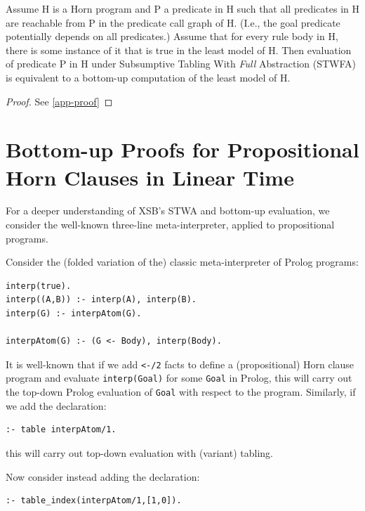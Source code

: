 \begin{theorem}
Assume H is a Horn program and P a predicate in H such that all
predicates in H are reachable from P in the predicate call graph of
H. (I.e., the goal predicate potentially depends on all predicates.)
Assume that for every rule body in H, there is some instance of it
that is true in the least model of H.  Then evaluation of predicate P
in H under Subsumptive Tabling With {\em Full} Abstraction (STWFA) is
equivalent to a bottom-up computation of the least model of H.
\end{theorem}

\begin{proof}
See \ref{app-proof}
\end{proof}


\section{Bottom-up Proofs for Propositional Horn Clauses in Linear Time}

For a deeper understanding of XSB's STWA and bottom-up evaluation, we
consider the well-known three-line meta-interpreter, applied to
propositional programs.

\begin{example}
Consider the (folded variation of the) classic meta-interpreter of
Prolog programs:

\footnotesize
\begin{verbatim}
interp(true).
interp((A,B)) :- interp(A), interp(B).
interp(G) :- interpAtom(G).
    
interpAtom(G) :- (G <- Body), interp(Body).
\end{verbatim}
\normalsize
\end{example}

It is well-known that if we add \verb|<-/2| facts to define a
(propositional) Horn clause program and evaluate {\tt interp(Goal)}
for some {\tt Goal} in Prolog, this will carry out the top-down Prolog
evaluation of {\tt Goal} with respect to the program.  Similarly, if we
add the declaration:

\footnotesize
\begin{verbatim}
:- table interpAtom/1. 
\end{verbatim}
\normalsize

\noindent this will carry out top-down evaluation with (variant)
tabling.

Now consider instead adding the declaration:

\footnotesize
\begin{verbatim}
:- table_index(interpAtom/1,[1,0]).
\end{verbatim}
\normalsize

